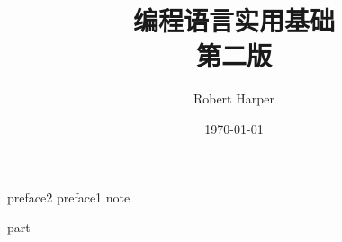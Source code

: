 \documentclass{ctexbook}
\title{{\Huge\textbf{编程语言实用基础}} \\第二版}
\author{Robert Harper}
\date{\today}
\begin{document}
\frontmatter
\maketitle

{preface2}
{preface1}
{note}
\tableofcontents

\newpage
\mainmatter

{part}

\backmatter
\appendix
\appendixpage
\printglossary[title=术语]
\end{document}
